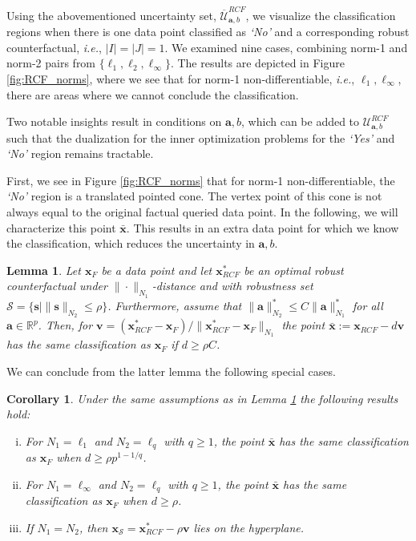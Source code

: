 \documentclass{article}
\newtheorem{lemma}[theorem]{Lemma}
\newtheorem{corollary}[theorem]{Corollary}
\begin{document}
{%
Using the abovementioned uncertainty set, $\overline{\mathcal{U}}_{\bm{a},b}^{RCF}$, we visualize the classification regions when there is one data point classified as \textit{`No'} and a corresponding robust counterfactual, \textit{i.e.}, $|I|=|J|=1$. We examined nine cases, combining norm-1 and norm-2 pairs from $\{\ell_1,\ell_2,\ell_{\infty}\}$. The results are depicted in Figure \ref{fig:RCF_norms}, where we see that for norm-1 non-differentiable, \textit{i.e.}, $\ell_1,\ell_{\infty}$, there are areas where we cannot conclude the classification.

Two notable insights result in conditions on $\bm{a},b$, which can be added to $\mathcal{U}_{\bm{a},b}^{RCF}$ such that the dualization for the inner optimization problems for the \textit{`Yes'} and \textit{`No'} region remains tractable.

First, we see in Figure \ref{fig:RCF_norms} that for norm-1 non-differentiable, the \textit{`No'} region is a translated pointed cone. The vertex point of this cone is not always equal to the original factual queried data point. In the following, we will characterize this point $\bar{\bm{x}}$. This results in an extra data point for which we know the classification, which reduces the uncertainty in $\bm{a},b$.

\begin{lemma}\label{lem:perspective_point}
Let $\bm{x}_F$ be a data point and let $\bm{x}_{RCF}^*$ be an optimal robust counterfactual under $\| \cdot\|_{N_1}$-distance and with robustness set $\mathcal{S}=\{\bm{s}\mid \|\bm{s}\|_{N_2}\leq \rho\}$. Furthermore, assume that $\|\bm{a}\|_{N_2}^*\le C \| \bm{a} \|_{N_1}^*$ for all $\bm{a}\in \mathbb R^p$. Then, for $\bm{v}=(\bm{x}_{RCF}^*-\bm{x}_F)/\|\bm{x}_{RCF}^*-\bm{x}_F\|_{N_1}$ the point $\bar{\bm{x}}:= \bm{x}_{RCF} -  d\bm{v}$ has the same classification as $\bm{x}_F$ if $d\ge \rho C$.
\end{lemma}
We can conclude from the latter lemma the following special cases.
\begin{corollary}\label{cor:N1N2}
Under the same assumptions as in Lemma \ref{lem:perspective_point} the following results hold:
    \begin{enumerate}[(i)]
        \item For $N_1=\ell_1$ and $N_2=\ell_q$ with $q\ge 1$, the point $\bar{\bm{x}}$ has the same classification as $\bm{x}_F$ when $d\geq \rho p^{1-1/q}$.
        \item For $N_1=\ell_{\infty}$ and $N_2=\ell_q$ with $q\ge 1$, the point $\bar{\bm{x}}$ has the same classification as $\bm{x}_F$ when $d\geq \rho$.
        \item If $N_1=N_2$, then $\bm{x}_\mathcal{S}=\bm{x}_{RCF}^*-\rho \bm{v}$ lies on the hyperplane.
    \end{enumerate}
\end{corollary}

}
\end{document}
